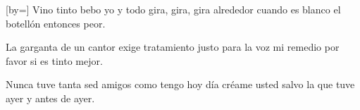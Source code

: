 
[by={}]
    \beginverse
        Vino tinto bebo yo 
        y todo gira, gira, gira alrededor 
        cuando es blanco el botellón 
        entonces peor.  
    \endverse
    
    
    
    \beginverse
        La garganta de un cantor 
        exige tratamiento justo para la voz 
        mi remedio por favor 
        si es tinto mejor.  
    \endverse

    

    \beginverse
        Nunca tuve tanta sed 
        amigos como tengo hoy día 
        créame usted 
        salvo la que tuve ayer 
        y antes de ayer.  
    \endverse
    
    

\endsong

\scleardpage